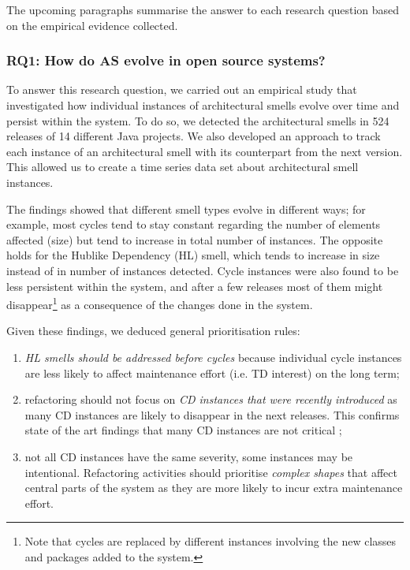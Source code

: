 The upcoming paragraphs summarise the answer to each research question based on the empirical evidence collected.

\subsubsection*{RQ1: How do AS evolve in open source systems?}
To answer this research question, we carried out an empirical study that investigated how individual instances of architectural smells evolve over time and persist within the system.
To do so, we detected the architectural smells in 524 releases of 14 different Java projects. 
We also developed an approach to track each instance of an architectural smell with its counterpart from the next version.
This allowed us to create a time series data set about architectural smell instances.

The findings showed that different smell types evolve in different ways; for example, most cycles tend to stay constant regarding the number of elements affected (size) but tend to increase in total number of instances.
The opposite holds for the Hublike Dependency (HL) smell, which tends to increase in size instead of in number of instances detected.
Cycle instances were also found to be less persistent within the system, and after a few releases most of them might disappear\footnote{Note that cycles are replaced by different instances involving the new classes and packages added to the system.} as a consequence of the changes done in the system.

Given these findings, we deduced general prioritisation rules:
\begin{enumerate}
\item \emph{HL smells should be addressed before cycles} because individual cycle instances are less likely to affect maintenance effort (i.e. TD interest) on the long term;
\item refactoring should not focus on \emph{CD instances that were recently introduced} as many CD instances are likely to disappear in the next releases. This confirms state of the art findings that many CD instances are not critical \cite{AlMutawa2014};
\item not all CD instances have the same severity, some instances may be intentional. Refactoring activities should prioritise \emph{complex shapes} that affect central parts of the system as they are more likely to incur extra maintenance effort.
\end{enumerate}


